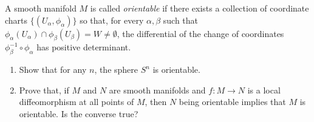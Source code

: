 \documentclass[12pt]{memoir}
\begin{document}
   \begin{Ej}
    A smooth manifold $M$ is called \emph{orientable} if there exists a collection of coordinate charts $\{(U_\alpha, \phi_\alpha)\}$ so that, for every $\alpha, \beta$ such that $\phi_\alpha(U_\alpha) \cap \phi_\beta(U_\beta) = W \neq \emptyset$, the differential of the change of coordinates $\phi_\beta^{-1} \circ \phi_\alpha$ has positive determinant.
	
	\begin{enumerate}
		\item Show that for any $n$, the sphere $S^n$ is orientable.
		
		\item Prove that, if $M$ and $N$ are smooth manifolds and $f: M \to N$ is a local diffeomorphism at all points of $M$, then $N$ being orientable implies that $M$ is orientable. Is the converse true?
	\end{enumerate}
   \end{Ej}
\end{document}
